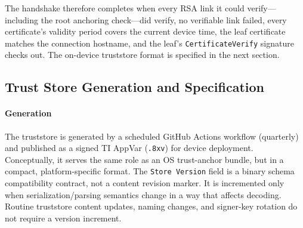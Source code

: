 \documentclass[titlepage]{report}
\begin{document}
	The handshake therefore completes when every RSA link it could verify---including the root anchoring check---did verify, no verifiable link failed, every certificate's validity period covers the current device time, the leaf certificate matches the connection hostname, and the leaf's \texttt{CertificateVerify} signature checks out. The on-device truststore format is specified in the next section.

	\subsection{Trust Store Generation and Specification}

	\paragraph{Generation}
	The truststore is generated by a scheduled GitHub Actions workflow (quarterly) and published as a signed TI AppVar (\texttt{.8xv}) for device deployment. Conceptually, it serves the same role as an OS trust-anchor bundle, but in a compact, platform-specific format.
	The \texttt{Store Version} field is a binary schema compatibility contract, not a content revision marker. It is incremented only when serialization/parsing semantics change in a way that affects decoding. Routine truststore content updates, naming changes, and signer-key rotation do not require a version increment.
\end{document}
